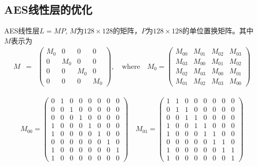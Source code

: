 \documentclass[11pt,a4paper]{article}
\begin{document}
\subsection{AES线性层的优化}

AES线性层$L=MP$, $M$为$128 \times 128$的矩阵，$P$为$128 \times 128$的单位置换矩阵。其中$M$表示为 
\begin{eqnarray*}
  M &=& \left(
  \begin{array}{cccc}
    M_0 & 0 & 0 & 0 \\
    0 & M_0 & 0 & 0 \\
    0 & 0 & M_0 & 0 \\
    0 & 0 & 0 & M_0
  \end{array}
  \right), \quad \text{where} \quad
  M_0 = \left(
  \begin{array}{cccc}
    M_{00} & M_{01} & M_{02} & M_{03} \\
    M_{03} & M_{00} & M_{01} & M_{02} \\
    M_{02} & M_{03} & M_{00} & M_{01} \\
    M_{01} & M_{02} & M_{03} & M_{00}
  \end{array}
  \right)
  \end{eqnarray*}

\begin{eqnarray*}
  M_{00} = \left(\begin{array}{rrrrrrrr}
    0 & 1 & 0 & 0 & 0 & 0 & 0 & 0 \\
    0 & 0 & 1 & 0 & 0 & 0 & 0 & 0 \\
    0 & 0 & 0 & 1 & 0 & 0 & 0 & 0 \\
    1 & 0 & 0 & 0 & 1 & 0 & 0 & 0 \\
    1 & 0 & 0 & 0 & 0 & 1 & 0 & 0 \\
    0 & 0 & 0 & 0 & 0 & 0 & 1 & 0 \\
    1 & 0 & 0 & 0 & 0 & 0 & 0 & 1 \\
    1 & 0 & 0 & 0 & 0 & 0 & 0 & 0
    \end{array}\right)\quad
  M_{01} = \left(\begin{array}{rrrrrrrr}
    1 & 1 & 0 & 0 & 0 & 0 & 0 & 0 \\
    0 & 1 & 1 & 0 & 0 & 0 & 0 & 0 \\
    0 & 0 & 1 & 1 & 0 & 0 & 0 & 0 \\
    1 & 0 & 0 & 1 & 1 & 0 & 0 & 0 \\
    1 & 0 & 0 & 0 & 1 & 1 & 0 & 0 \\
    0 & 0 & 0 & 0 & 0 & 1 & 1 & 0 \\
    1 & 0 & 0 & 0 & 0 & 0 & 1 & 1 \\
    1 & 0 & 0 & 0 & 0 & 0 & 0 & 1
    \end{array}\right)
\end{eqnarray*}
\end{document}
